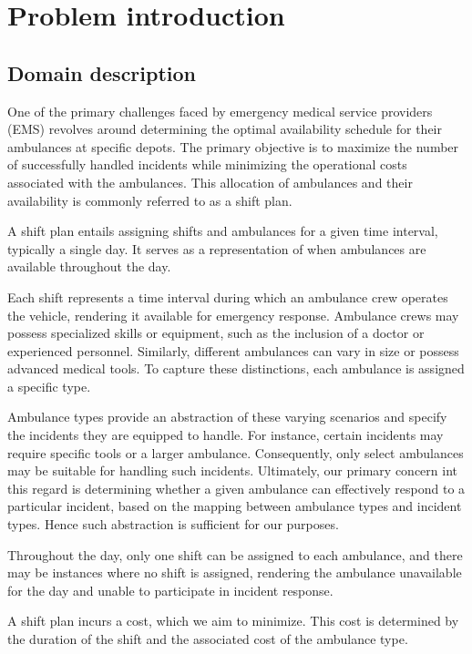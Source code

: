 \setlength{\parindent}{0pt}

\chapter{Problem introduction}

\section{Domain description}

One of the primary challenges faced by emergency medical service providers
(EMS) revolves around determining the optimal availability schedule for their
ambulances at specific depots. The primary objective is to maximize the number
of successfully handled incidents while minimizing the operational costs
associated with the ambulances. This allocation of ambulances and their
availability is commonly referred to as a shift plan.

A shift plan entails assigning shifts and ambulances for a given time interval,
typically a single day. It serves as a representation of when ambulances are
available throughout the day.

Each shift represents a time interval during which an ambulance crew operates
the vehicle, rendering it available for emergency response. Ambulance crews may
possess specialized skills or equipment, such as the inclusion of a doctor or
experienced personnel. Similarly, different ambulances can vary in size or
possess advanced medical tools. To capture these distinctions, each ambulance
is assigned a specific type.

Ambulance types provide an abstraction of these varying scenarios and specify
the incidents they are equipped to handle. For instance, certain incidents may
require specific tools or a larger ambulance. Consequently, only select
ambulances may be suitable for handling such incidents. Ultimately, our primary
concern int this regard is determining whether a given ambulance can
effectively respond to a particular incident, based on the mapping between
ambulance types and incident types. Hence such abstraction is sufficient for
our purposes.

Throughout the day, only one shift can be assigned to each ambulance, and there
may be instances where no shift is assigned, rendering the ambulance
unavailable for the day and unable to participate in incident response.

A shift plan incurs a cost, which we aim to minimize. This cost is determined
by the duration of the shift and the associated cost of the ambulance type.

